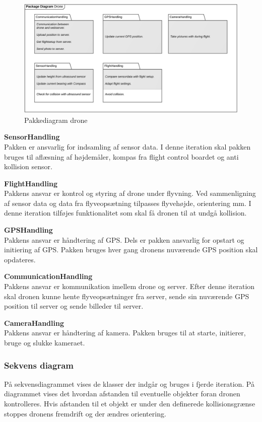\begin{figure}[H]
	\centering
	\includegraphics[width=1\textwidth]{Billeder/pakke_diagrammer/iteration4_drone.png}
	\vspace{-0.5cm}
	\caption{Pakkediagram drone}
	\label{fig:iteration4_pakke_diagram_drone}
\end{figure}

\textbf{SensorHandling}\\
Pakken er ansvarlig for indsamling af sensor data. I denne iteration skal pakken bruges til aflæsning af højdemåler, kompas fra flight control boardet og anti kollision sensor. 

\textbf{FlightHandling}\\
Pakkens ansvar er kontrol og styring af drone under flyvning. Ved sammenligning af sensor data og data fra flyveopsætning tilpasses flyvehøjde, orientering mm. 
I denne iteration tilføjes funktionalitet som skal få dronen til at undgå kollision. 

\textbf{GPSHandling}\\
Pakkens ansvar er håndtering af GPS. Dels er pakken ansvarlig for opstart og initiering af GPS. Pakken bruges hver gang dronens nuværende GPS position skal opdateres.

\textbf{CommunicationHandling}\\
Pakkens ansvar er kommunikation imellem drone og server. Efter denne iteration skal dronen kunne hente flyveopsætninger fra server, sende sin nuværende GPS position til server og sende billeder til server.

\textbf{CameraHandling}\\
Pakkens ansvar er håndtering af kamera. Pakken bruges til at starte, initierer, bruge og slukke kameraet.


\newpage
\subsubsection*{Sekvens diagram}
\vspace{-0.2cm}
På sekvensdiagrammet vises de klasser der indgår og bruges i fjerde iteration. 
På diagrammet vises det hvordan afstanden til eventuelle objekter foran dronen kontrolleres. Hvis afstanden til et objekt er under den definerede kollisionsgrænse stoppes dronens fremdrift og der ændres orientering. 


